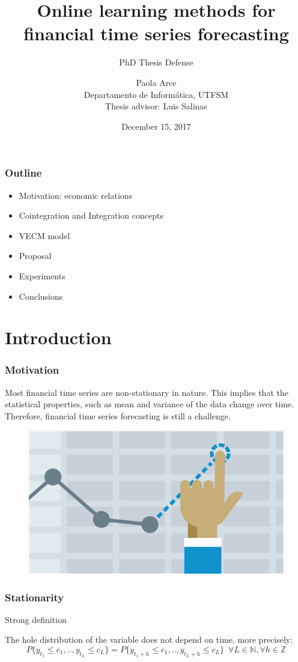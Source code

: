 \documentclass{beamer}
\author[Paola Arce]{Paola Arce \\ Departamento de Inform\'atica, UTFSM \\ Thesis advisor: Luis Salinas}
\date{December 15, 2017}
\title[Thesis defense]{Online learning methods for financial time series forecasting}
\subtitle{PhD Thesis Defense}
\begin{document}
\begin{frame}[plain]
\titlepage
\end{frame}


\begin{frame}
\frametitle{Outline}
\begin{itemize}
\item Motivation: economic relations
\item Cointegration and Integration concepts
\item VECM model
\item Proposal
\item Experiments
\item Conclusions
\end{itemize}
\end{frame}

\section{Introduction}

\begin{frame}
\frametitle{Motivation}
Most financial time series are non-stationary in nature. This implies that the statistical properties, such as mean and variance of the data change over time. Therefore, financial time series forecasting is still a challenge.
\begin{figure}
\includegraphics[width=0.4\paperwidth]{img/forecast}
\end{figure}
\end{frame}

\begin{frame}
\frametitle{Stationarity}
\begin{block}{Strong definition}

The hole distribution of the variable does not depend on time, more precisely:
\small
\begin{equation*}
P\{y_{t_1} \leq
c_1,..,y_{t_L} \leq c_L\} = P\{y_{t_1+h} \leq c_1,..,y_{t_L+h} \leq c_L\}\enspace\forall L \in \mathbb{N}, \forall h \in \mathbb{Z}
\end{equation*}
\end{block}
\end{frame}
\end{document}
